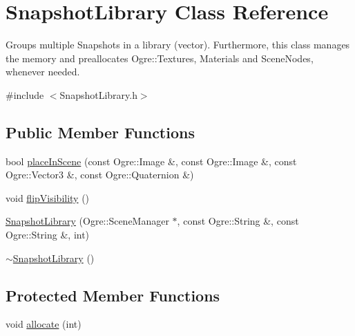 \hypertarget{classSnapshotLibrary}{\section{\-Snapshot\-Library \-Class \-Reference}
\label{classSnapshotLibrary}
}


\-Groups multiple \-Snapshots in a library (vector). \-Furthermore, this class manages the memory and preallocates \-Ogre\-::\-Textures, \-Materials and \-Scene\-Nodes, whenever needed.  




{\ttfamily \#include $<$\-Snapshot\-Library.\-h$>$}

\subsection*{\-Public \-Member \-Functions}
\begin{DoxyCompactItemize}
\item 
bool \hyperlink{classSnapshotLibrary_a211bd4eb1b15c8ae8dda57ff953528e1}{place\-In\-Scene} (const \-Ogre\-::\-Image \&, const \-Ogre\-::\-Image \&, const \-Ogre\-::\-Vector3 \&, const \-Ogre\-::\-Quaternion \&)
\item 
void \hyperlink{classSnapshotLibrary_ac8c6b6aaee929d20cdbfc3df95c61998}{flip\-Visibility} ()
\item 
\hyperlink{classSnapshotLibrary_a2db1cb6e6550c677b9a609964b7a74cb}{\-Snapshot\-Library} (\-Ogre\-::\-Scene\-Manager $\ast$, const \-Ogre\-::\-String \&, const \-Ogre\-::\-String \&, int)
\item 
\hyperlink{classSnapshotLibrary_a0eb263c926c8607b8943550984915933}{$\sim$\-Snapshot\-Library} ()
\end{DoxyCompactItemize}
\subsection*{\-Protected \-Member \-Functions}
\begin{DoxyCompactItemize}
\item 
void \hyperlink{classSnapshotLibrary_af8b18edc145bf95a04f3c64659ce0904}{allocate} (int)
\end{DoxyCompactItemize}
